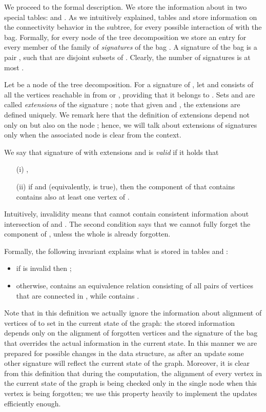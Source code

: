 \documentclass[a4paper,11pt]{article}
\theoremstyle{definition}
\theoremstyle{remark}
\begin{document}
We proceed to the formal description.  We store the information about
 in two special tables:  and .  As we intuitively
explained, tables  and  store information on the
connectivity behavior in the subtree, for every possible interaction
of  with the bag.  Formally, for every node of the tree
decomposition  we store an entry for every member of the family of
{\emph{signatures}} of the bag .  A signature of the bag  is
a pair , such that  are disjoint subsets of .
Clearly, the number of signatures is at most .

Let  be a node of the tree decomposition.  For a signature
 of , let  and
 consists of all the vertices reachable in  from  or , providing that it belongs to .
Sets  and  are called {\emph{extensions}} of
the signature ; note that given  and , the extensions
are defined uniquely.  We remark here that the definition of
extensions depend not only on  but also on the node ; hence,
we will talk about extensions of signatures only when the associated
node is clear from the context.

We say that signature  of  with extensions  and
 is {\emph{valid}} if it holds that
\begin{itemize}
\item[(i)] ,
\item[(ii)] if  and  (equivalently,  is 
  true), then the
  component of  that contains  contains also at
  least one vertex of .
\end{itemize}
Intuitively, invalidity means that  cannot contain consistent
information about intersection of  and .  The second condition
says that we cannot fully forget the component of , unless the
whole  is already forgotten.

Formally, the following invariant explains what is stored in tables
 and :
\begin{itemize}
\item if  is invalid then ;
\item otherwise,  contains an equivalence relation 
  consisting of all pairs of vertices  that are
  connected in , while  contains
  .
\end{itemize}

Note that in this definition we actually ignore the information about
alignment of vertices of  to set  in the current state of
the graph: the stored information depends only on the alignment of forgotten
vertices and the signature of the bag that overrides the actual
information in the current state.  In this manner we are prepared for
possible changes in the data structure, as after an update some other
signature will reflect the current state of the graph.  Moreover, it
is clear from this definition that during the computation, the
alignment of every vertex  in the current state of the graph is
being checked only in the single node  when this vertex is being
forgotten; we use this property heavily to implement the updates
efficiently enough.
\end{document}
